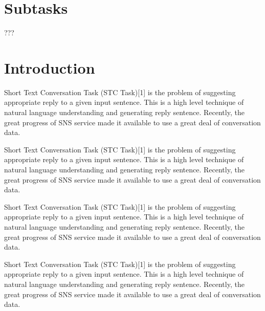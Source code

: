 \documentclass{../style/sig-alternate}
\begin{document}
\section*{Subtasks}
???


\section{Introduction}

Short Text Conversation Task (STC Task)[1] is the problem of suggesting appropriate reply to a given input sentence. This is a high level technique of natural language understanding and generating reply sentence. Recently, the great progress of SNS service made it available to use a great deal of conversation data. 

Short Text Conversation Task (STC Task)[1] is the problem of suggesting appropriate reply to a given input sentence. This is a high level technique of natural language understanding and generating reply sentence. Recently, the great progress of SNS service made it available to use a great deal of conversation data. 

Short Text Conversation Task (STC Task)[1] is the problem of suggesting appropriate reply to a given input sentence. This is a high level technique of natural language understanding and generating reply sentence. Recently, the great progress of SNS service made it available to use a great deal of conversation data. 

Short Text Conversation Task (STC Task)[1] is the problem of suggesting appropriate reply to a given input sentence. This is a high level technique of natural language understanding and generating reply sentence. Recently, the great progress of SNS service made it available to use a great deal of conversation data. 

% 
\end{document}
